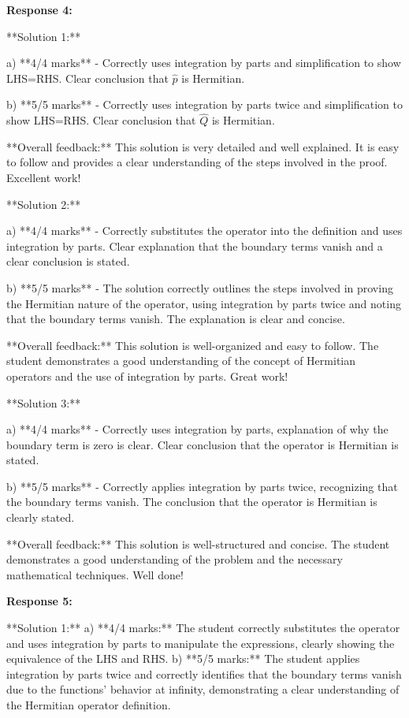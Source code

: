 \documentclass[a4paper,11pt]{article}
\begin{document}
\textbf{Response 4:}

**Solution 1:**

a) **4/4 marks** - Correctly uses integration by parts and simplification to show LHS=RHS. Clear conclusion that \(\hat{p}\) is Hermitian.

b) **5/5 marks** - Correctly uses integration by parts twice and simplification to show LHS=RHS. Clear conclusion that \(\hat{Q}\) is Hermitian. 

**Overall feedback:** This solution is very detailed and well explained. It is easy to follow and provides a clear understanding of the steps involved in the proof. Excellent work!

**Solution 2:**

a) **4/4 marks** - Correctly substitutes the operator into the definition and uses integration by parts. Clear explanation that the boundary terms vanish and a clear conclusion is stated. 

b) **5/5 marks** - The solution correctly outlines the steps involved in proving the Hermitian nature of the operator, using integration by parts twice and noting that the boundary terms vanish. The explanation is clear and concise.

**Overall feedback:** This solution is well-organized and easy to follow. The student demonstrates a good understanding of the concept of Hermitian operators and the use of integration by parts. Great work!

**Solution 3:** 

a) **4/4 marks** - Correctly uses integration by parts, explanation of why the boundary term is zero is clear. Clear conclusion that the operator is Hermitian is stated. 

b) **5/5 marks** - Correctly applies integration by parts twice, recognizing that the boundary terms vanish. The conclusion that the operator is Hermitian is clearly stated.

**Overall feedback:** This solution is well-structured and concise. The student demonstrates a good understanding of the problem and the necessary mathematical techniques. Well done!


\textbf{Response 5:}

**Solution 1:**
a) **4/4 marks:** The student correctly substitutes the operator and uses integration by parts to manipulate the expressions, clearly showing the equivalence of the LHS and RHS.
b) **5/5 marks:** The student applies integration by parts twice and correctly identifies that the boundary terms vanish due to the functions' behavior at infinity, demonstrating a clear understanding of the Hermitian operator definition.
\end{document}
